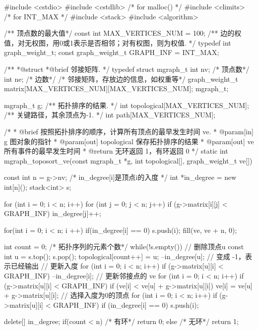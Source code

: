 \begin{Codex}[label=mgraph_critical_path.c]
#include <cstdio>
#include <cstdlib>  /* for malloc() */
#include <climits>  /* for INT_MAX */
#include <stack>
#include <algorithm>

/** 顶点数的最大值*/
const int MAX_VERTICES_NUM = 100;
/** 边的权值，对无权图，用0或1表示是否相邻；对有权图，则为权值. */
typedef int graph_weight_t;
const graph_weight_t GRAPH_INF = INT_MAX;

/**
 *@struct
 *@brief 邻接矩阵.
 */
typedef struct mgraph_t {
    int nv; /* 顶点数*/
    int ne; /* 边数*/
    /* 邻接矩阵，存放边的信息，如权重等*/
    graph_weight_t matrix[MAX_VERTICES_NUM][MAX_VERTICES_NUM];
} mgraph_t;

mgraph_t g;
/** 拓扑排序的结果. */
int topological[MAX_VERTICES_NUM];
/** 关键路径，其余顶点为-1. */
int path[MAX_VERTICES_NUM];

/*
  * @brief 按照拓扑排序的顺序，计算所有顶点的最早发生时间 ve.
  * @param[in] g 图对象的指针
  * @param[out] topological 保存拓扑排序的结果
  * @param[out] ve 所有事件的最早发生时间
  * @return 无环返回 1，有环返回 0
  */
static int mgraph_toposort_ve(const mgraph_t *g, int topological[],
        graph_weight_t ve[]) {
    const int n = g->nv;
    /* in_degree[i]是顶点i的入度 */
    int *in_degree = new int[n]();
    stack<int> s;

    for (int i = 0; i < n; i++) {
        for (int j = 0; j < n; j++) {
            if (g->matrix[i][j] < GRAPH_INF)
                in_degree[j]++;
        }
    }

    for(int i = 0; i < n; i ++) {
        if(in_degree[i] == 0) {
            s.push(i);
        }
    }
    fill(ve, ve + n, 0);

    int count = 0; /* 拓扑序列的元素个数*/
    while(!s.empty()) {
        // 删除顶点u
        const int u = s.top(); s.pop();
        topological[count++] = u;
        --in_degree[u];  // 变成 -1，表示已经输出
        // 更新入度
        for (int i = 0; i < n; i++) if (g->matrix[u][i] < GRAPH_INF) {
            --in_degree[i];
        }
        // 更新邻接点的 ve
        for (int i = 0; i < n; i++) if (g->matrix[u][i] < GRAPH_INF) {
            if (ve[i] < ve[u] + g->matrix[u][i])
                ve[i] = ve[u] + g->matrix[u][i];
        }
        // 选择入度为0的顶点
        for (int i = 0; i < n; i++) if (g->matrix[u][i] < GRAPH_INF) {
            if (in_degree[i] == 0) s.push(i);
        }
    }

    delete[] in_degree;
    if(count < n) { /* 有环*/
        return 0;
    } else { /* 无环*/
        return 1;
    }
}


\end{Codex}
